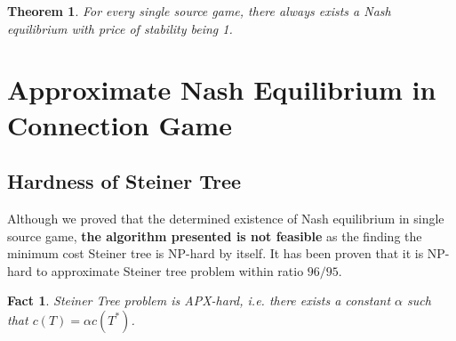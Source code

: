 \documentclass[11pt,psfig,times]{article}
\newtheorem{theorem}{Theorem}[section]
\newtheorem{fact}{Fact}
\begin{document}
	
		\begin{theorem}
			For every single source game, there always exists a Nash equilibrium with price of stability being 1.
		\end{theorem}
	
	
\section{Approximate Nash Equilibrium in Connection Game}
	\subsection{Hardness of Steiner Tree}
	Although we proved that the determined existence of Nash equilibrium in single source game, \textbf{the algorithm presented is not feasible} as the finding the minimum cost Steiner tree is NP-hard by itself. It has been proven that it is NP-hard to approximate Steiner tree problem within ratio \(96/95\). 
		
		\begin{fact}
			Steiner Tree problem is APX-hard, i.e. there exists a constant $\alpha$ such that $c(T) = \alpha c(T^*)$.
		\end{fact}
		
\end{document}
